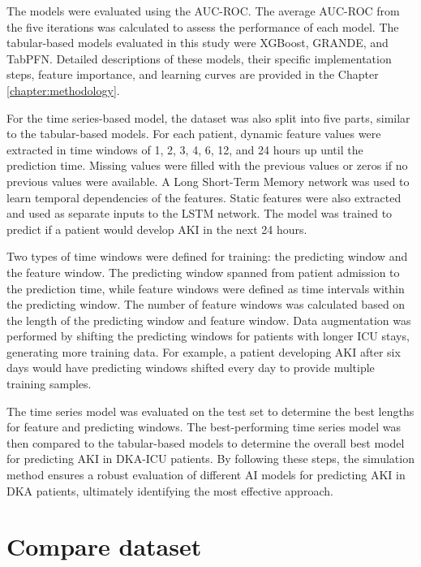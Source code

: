 \documentclass[../main.tex]{subfiles}
\begin{document}
The models were evaluated using the \gls{AUC-ROC}.
The average AUC-ROC from the five iterations was calculated to assess the performance of each model.
The tabular-based models evaluated in this study were XGBoost, GRANDE, and TabPFN.
Detailed descriptions of these models, their specific implementation steps, feature importance, and learning curves are provided in the Chapter \ref{chapter:methodology}.

For the time series-based model, the dataset was also split into five parts, similar to the tabular-based models.
For each patient, dynamic feature values were extracted in time windows of 1, 2, 3, 4, 6, 12, and 24 hours up until the prediction time.
Missing values were filled with the previous values or zeros if no previous values were available.
A Long Short-Term Memory network was used to learn temporal dependencies of the features.
Static features were also extracted and used as separate inputs to the \gls{LSTM} network.
The model was trained to predict if a patient would develop \gls{AKI} in the next 24 hours.

Two types of time windows were defined for training: the predicting window and the feature window.
The predicting window spanned from patient admission to the prediction time, while feature windows were defined as time intervals within the predicting window.
The number of feature windows was calculated based on the length of the predicting window and feature window.
Data augmentation was performed by shifting the predicting windows for patients with longer \gls{ICU} stays, generating more training data.
For example, a patient developing \gls{AKI} after six days would have predicting windows shifted every day to provide multiple training samples.

The time series model was evaluated on the test set to determine the best lengths for feature and predicting windows.
The best-performing time series model was then compared to the tabular-based models to determine the overall best model for predicting \gls{AKI} in \gls{DKA-ICU} patients.
By following these steps, the simulation method ensures a robust evaluation of different AI models for predicting \gls{AKI} in \gls{DKA} patients, ultimately identifying the most effective approach.



\section{Compare dataset}
\end{document}
